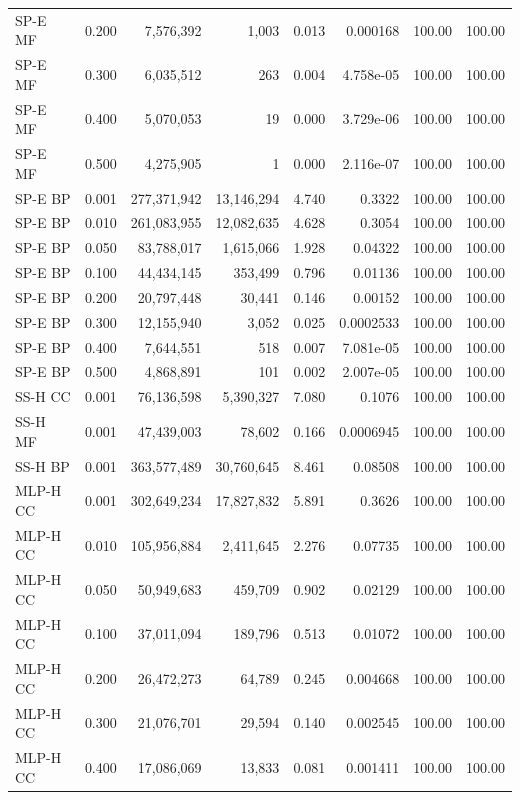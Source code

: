 \begin{longtable}{lrrrrrrr}
SP-E MF & 0.200 & 7,576,392 & 1,003 & 0.013 & 0.000168 & 100.00 & 100.00 \\
SP-E MF & 0.300 & 6,035,512 & 263 & 0.004 & 4.758e-05 & 100.00 & 100.00 \\
SP-E MF & 0.400 & 5,070,053 & 19 & 0.000 & 3.729e-06 & 100.00 & 100.00 \\
SP-E MF & 0.500 & 4,275,905 & 1 & 0.000 & 2.116e-07 & 100.00 & 100.00 \\
SP-E BP & 0.001 & 277,371,942 & 13,146,294 & 4.740 & 0.3322 & 100.00 & 100.00 \\
SP-E BP & 0.010 & 261,083,955 & 12,082,635 & 4.628 & 0.3054 & 100.00 & 100.00 \\
SP-E BP & 0.050 & 83,788,017 & 1,615,066 & 1.928 & 0.04322 & 100.00 & 100.00 \\
SP-E BP & 0.100 & 44,434,145 & 353,499 & 0.796 & 0.01136 & 100.00 & 100.00 \\
SP-E BP & 0.200 & 20,797,448 & 30,441 & 0.146 & 0.00152 & 100.00 & 100.00 \\
SP-E BP & 0.300 & 12,155,940 & 3,052 & 0.025 & 0.0002533 & 100.00 & 100.00 \\
SP-E BP & 0.400 & 7,644,551 & 518 & 0.007 & 7.081e-05 & 100.00 & 100.00 \\
SP-E BP & 0.500 & 4,868,891 & 101 & 0.002 & 2.007e-05 & 100.00 & 100.00 \\
SS-H CC & 0.001 & 76,136,598 & 5,390,327 & 7.080 & 0.1076 & 100.00 & 100.00 \\
SS-H MF & 0.001 & 47,439,003 & 78,602 & 0.166 & 0.0006945 & 100.00 & 100.00 \\
SS-H BP & 0.001 & 363,577,489 & 30,760,645 & 8.461 & 0.08508 & 100.00 & 100.00 \\
MLP-H CC & 0.001 & 302,649,234 & 17,827,832 & 5.891 & 0.3626 & 100.00 & 100.00 \\
MLP-H CC & 0.010 & 105,956,884 & 2,411,645 & 2.276 & 0.07735 & 100.00 & 100.00 \\
MLP-H CC & 0.050 & 50,949,683 & 459,709 & 0.902 & 0.02129 & 100.00 & 100.00 \\
MLP-H CC & 0.100 & 37,011,094 & 189,796 & 0.513 & 0.01072 & 100.00 & 100.00 \\
MLP-H CC & 0.200 & 26,472,273 & 64,789 & 0.245 & 0.004668 & 100.00 & 100.00 \\
MLP-H CC & 0.300 & 21,076,701 & 29,594 & 0.140 & 0.002545 & 100.00 & 100.00 \\
MLP-H CC & 0.400 & 17,086,069 & 13,833 & 0.081 & 0.001411 & 100.00 & 100.00 \\

\end{longtable}
